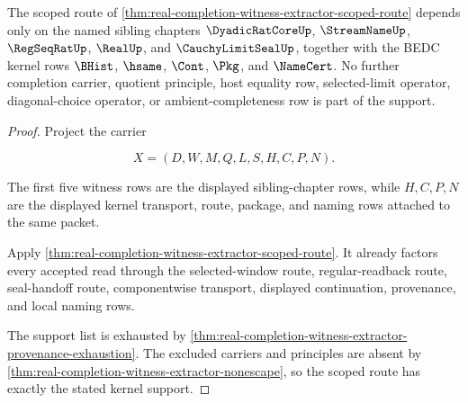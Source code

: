 \begin{theorem}
\label{thm:real-completion-witness-extractor-kernel-support-scope}
The scoped route of \autoref{thm:real-completion-witness-extractor-scoped-route} depends only on the named sibling chapters $\DyadicRatCoreUp$, $\StreamNameUp$, $\RegSeqRatUp$, $\RealUp$, and $\CauchyLimitSealUp$, together with the BEDC kernel rows $\BHist$, $\hsame$, $\Cont$, $\Pkg$, and $\NameCert$. No further completion carrier, quotient principle, host equality row, selected-limit operator, diagonal-choice operator, or ambient-completeness row is part of the support.
\end{theorem}
\begin{proof}
Project the carrier

$$
X=(D,W,M,Q,L,S,H,C,P,N).
$$

The first five witness rows are the displayed sibling-chapter rows, while $H,C,P,N$ are the displayed kernel transport, route, package, and naming rows attached to the same packet.

Apply \autoref{thm:real-completion-witness-extractor-scoped-route}. It already factors every accepted read through the selected-window route, regular-readback route, seal-handoff route, componentwise transport, displayed continuation, provenance, and local naming rows.

The support list is exhausted by \autoref{thm:real-completion-witness-extractor-provenance-exhaustion}. The excluded carriers and principles are absent by \autoref{thm:real-completion-witness-extractor-nonescape}, so the scoped route has exactly the stated kernel support.
\end{proof}

